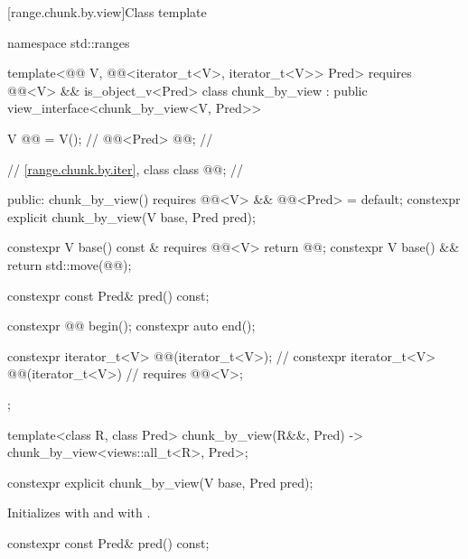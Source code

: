 [range.chunk.by.view]{Class template }

%
\begin{codeblock}
namespace std::ranges {
  template<@@ V, @@<iterator_t<V>, iterator_t<V>> Pred>
    requires @@<V> && is_object_v<Pred>
  class chunk_by_view : public view_interface<chunk_by_view<V, Pred>> {
    V @@ = V();                                          // \expos
    @@<Pred> @@;                                // \expos

    // \ref{range.chunk.by.iter}, class 
    class @@;                                         // \expos

  public:
    chunk_by_view() requires @@<V> && @@<Pred> = default;
    constexpr explicit chunk_by_view(V base, Pred pred);

    constexpr V base() const & requires @@<V> { return @@; }
    constexpr V base() && { return std::move(@@); }

    constexpr const Pred& pred() const;

    constexpr @@ begin();
    constexpr auto end();

    constexpr iterator_t<V> @@(iterator_t<V>);       // \expos
    constexpr iterator_t<V> @@(iterator_t<V>)        // \expos
      requires @@<V>;
  };

  template<class R, class Pred>
    chunk_by_view(R&&, Pred) -> chunk_by_view<views::all_t<R>, Pred>;
}
\end{codeblock}

%
\begin{itemdecl}
constexpr explicit chunk_by_view(V base, Pred pred);
\end{itemdecl}

\begin{itemdescr}
\pnum
\effects
Initializes  with  and
 with .
\end{itemdescr}

%
\begin{itemdecl}
constexpr const Pred& pred() const;
\end{itemdecl}

